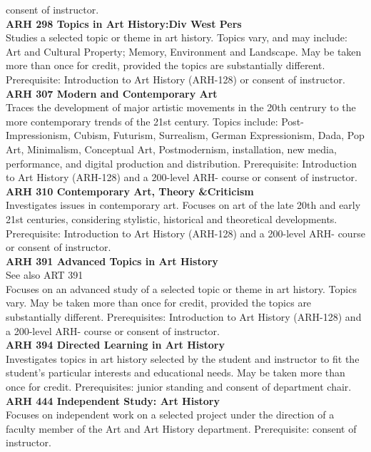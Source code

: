 \documentclass[
  letterpaper,
]{scrbook}
\begin{document}
consent of instructor.\\
\textbf{ARH 298 Topics in Art History:Div West Pers}\\
Studies a selected topic or theme in art history. Topics vary, and may
include: Art and Cultural Property; Memory, Environment and Landscape.
May be taken more than once for credit, provided the topics are
substantially different. Prerequisite: Introduction to Art History
(ARH-128) or consent of instructor.\\
\textbf{ARH 307 Modern and Contemporary Art}\\
Traces the development of major artistic movements in the 20th centrury
to the more contemporary trends of the 21st century. Topics include:
Post-Impressionism, Cubism, Futurism, Surrealism, German Expressionism,
Dada, Pop Art, Minimalism, Conceptual Art, Postmodernism, installation,
new media, performance, and digital production and distribution.
Prerequisite: Introduction to Art History (ARH-128) and a 200-level ARH-
course or consent of instructor.\\
\textbf{ARH 310 Contemporary Art, Theory \&Criticism}\\
Investigates issues in contemporary art. Focuses on art of the late 20th
and early 21st centuries, considering stylistic, historical and
theoretical developments. Prerequisite: Introduction to Art History
(ARH-128) and a 200-level ARH- course or consent of instructor.\\
\textbf{ARH 391 Advanced Topics in Art History}\\
See also ART 391\\
Focuses on an advanced study of a selected topic or theme in art
history. Topics vary. May be taken more than once for credit, provided
the topics are substantially different. Prerequisites: Introduction to
Art History (ARH-128) and a 200-level ARH- course or consent of
instructor.\\
\textbf{ARH 394 Directed Learning in Art History}\\
Investigates topics in art history selected by the student and
instructor to fit the student's particular interests and educational
needs. May be taken more than once for credit. Prerequisites: junior
standing and consent of department chair.\\
\textbf{ARH 444 Independent Study: Art History}\\
Focuses on independent work on a selected project under the direction of
a faculty member of the Art and Art History department. Prerequisite:
consent of instructor.\\
\end{document}
